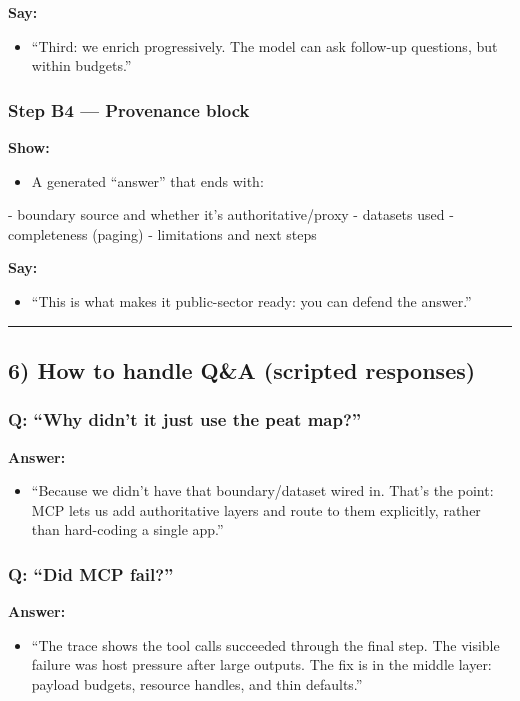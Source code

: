 \textbf{Say:}
\begin{itemize}[leftmargin=*]
\item “Third: we enrich progressively. The model can ask follow-up questions, but within budgets.”
\end{itemize}

\subsubsection{Step B4 — Provenance block}
\textbf{Show:}
\begin{itemize}[leftmargin=*]
\item A generated “answer” that ends with:
\end{itemize}
  - boundary source and whether it’s authoritative/proxy
  - datasets used
  - completeness (paging)
  - limitations and next steps

\textbf{Say:}
\begin{itemize}[leftmargin=*]
\item “This is what makes it public-sector ready: you can defend the answer.” \cite{prov_o,algorithmic_transparency_recording_standard}
\end{itemize}

\par\medskip\hrule\medskip

\subsection{6) How to handle Q\&A (scripted responses)}

\subsubsection{Q: “Why didn’t it just use the peat map?”}
\textbf{Answer:}
\begin{itemize}[leftmargin=*]
\item “Because we didn’t have that boundary/dataset wired in. That’s the point: MCP lets us add authoritative layers and route to them explicitly, rather than hard-coding a single app.”
\end{itemize}

\subsubsection{Q: “Did MCP fail?”}
\textbf{Answer:}
\begin{itemize}[leftmargin=*]
\item “The trace shows the tool calls succeeded through the final step. The visible failure was host pressure after large outputs. The fix is in the middle layer: payload budgets, resource handles, and thin defaults.”
\end{itemize}


